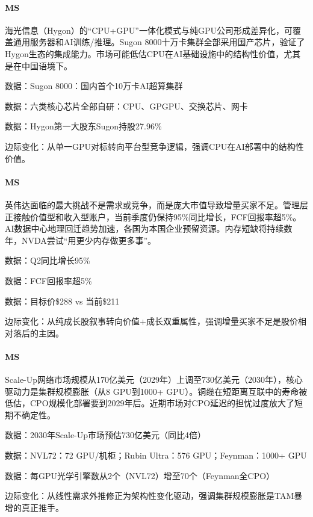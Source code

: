 \documentclass[11pt]{ctexart}
\begin{document}
\paragraph{MS} 海光信息（Hygon）的“CPU+GPU”一体化模式与纯GPU公司形成差异化，可覆盖通用服务器和AI训练/推理。Sugon 8000十万卡集群全部采用国产芯片，验证了Hygon生态的集成能力。市场可能低估CPU在AI基础设施中的结构性价值，尤其是在中国语境下。
{\small\color{refgray}数据：Sugon 8000：国内首个10万卡AI超算集群\par}
{\small\color{refgray}数据：六类核心芯片全部自研：CPU、GPGPU、交换芯片、网卡\par}
{\small\color{refgray}数据：Hygon第一大股东Sugon持股27.96\%\par}
{\small\color{refgray}边际变化：从单一GPU对标转向平台型竞争逻辑，强调CPU在AI部署中的结构性价值。\par}
\paragraph{MS} 英伟达面临的最大挑战不是需求或竞争，而是庞大市值导致增量买家不足。管理层正接触价值型和收入型账户，当前季度仍保持95\%同比增长，FCF回报率超5\%。AI数据中心地理回迁趋势加速，各国为本国企业预留资源。内存短缺将持续数年，NVDA尝试“用更少内存做更多事”。
{\small\color{refgray}数据：Q2同比增长95\%\par}
{\small\color{refgray}数据：FCF回报率超5\%\par}
{\small\color{refgray}数据：目标价\$288 vs 当前\$211\par}
{\small\color{refgray}边际变化：从纯成长股叙事转向价值+成长双重属性，强调增量买家不足是股价相对落后的主因。\par}
\paragraph{MS} Scale-Up网络市场规模从170亿美元（2029年）上调至730亿美元（2030年），核心驱动力是集群规模膨胀（从8 GPU到1000+ GPU）。铜缆在短距离互联中的寿命被低估，CPO规模化部署要到2029年后。近期市场对CPO延迟的担忧过度放大了短期不确定性。
{\small\color{refgray}数据：2030年Scale-Up市场预估730亿美元（同比4倍）\par}
{\small\color{refgray}数据：NVL72：72 GPU/机柜；Rubin Ultra：576 GPU；Feynman：1000+ GPU\par}
{\small\color{refgray}数据：每GPU光学引擎数从2个（NVL72）增至70个（Feynman全CPO）\par}
{\small\color{refgray}边际变化：从线性需求外推修正为架构性变化驱动，强调集群规模膨胀是TAM暴增的真正推手。\par}
\end{document}
